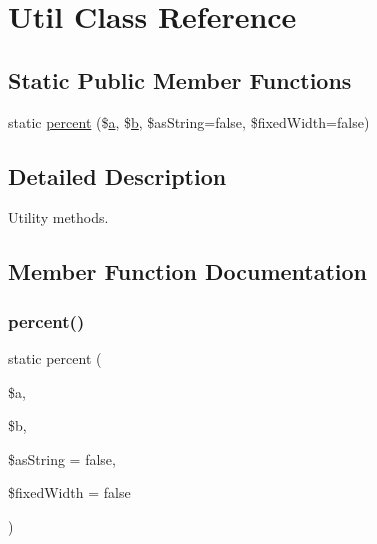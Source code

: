 \hypertarget{class_sebastian_bergmann_1_1_code_coverage_1_1_util}{}\section{Util Class Reference}
\label{class_sebastian_bergmann_1_1_code_coverage_1_1_util}
\subsection*{Static Public Member Functions}
\begin{DoxyCompactItemize}
\item 
static \mbox{\hyperlink{class_sebastian_bergmann_1_1_code_coverage_1_1_util_a088cb7b3794c823342a5ed135136d97b}{percent}} (\$\mbox{\hyperlink{interfacea}{a}}, \$\mbox{\hyperlink{interfaceb}{b}}, \$as\+String=false, \$fixed\+Width=false)
\end{DoxyCompactItemize}


\subsection{Detailed Description}
Utility methods. 

\subsection{Member Function Documentation}
\mbox{\label{class_sebastian_bergmann_1_1_code_coverage_1_1_util_a088cb7b3794c823342a5ed135136d97b}} 
\subsubsection{\texorpdfstring{percent()}{percent()}}
{\footnotesize\ttfamily static percent (\begin{DoxyParamCaption}\item[{}]{\$a,  }\item[{}]{\$b,  }\item[{}]{\$as\+String = {\ttfamily false},  }\item[{}]{\$fixed\+Width = {\ttfamily false} }\end{DoxyParamCaption})\hspace{0.3cm}{\ttfamily [static]}}


